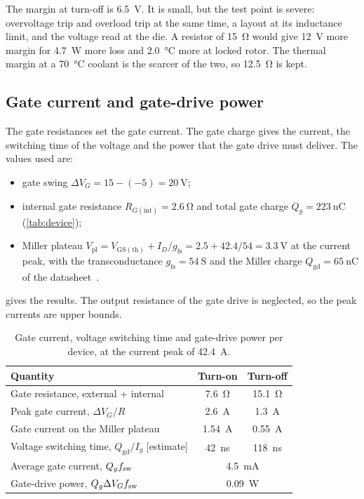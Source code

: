 The margin at turn-off is \SI{6.5}{\volt}. It is small, but the test point
is severe: overvoltage trip and overload trip at the same time, a layout at
its inductance limit, and the voltage read at the die. A resistor of
\SI{15}{\ohm} would give \SI{12}{\volt} more margin for \SI{4.7}{\watt} more
loss and \SI{2.0}{\celsius} more at locked rotor. The thermal margin at a
\SI{70}{\celsius} coolant is the scarcer of the two, so \SI{12.5}{\ohm} is
kept.

\subsection{Gate current and gate-drive power}
\label{sec:gatecurrent}

The gate resistances set the gate current. The gate charge gives the
current, the switching time of the voltage and the power that the gate drive
must deliver. The values used are:
\begin{itemize}
  \item gate swing $\Delta V_G = 15 - (-5) = \SI{20}{\volt}$;
  \item internal gate resistance $R_{G(\mathrm{int})} = \SI{2.6}{\ohm}$ and
        total gate charge $Q_g = \SI{223}{\nano\coulomb}$ (\cref{tab:device});
  \item Miller plateau $V_\mathrm{pl} = V_\mathrm{GS(th)} + I_D/g_\mathrm{fs}
        = 2.5 + 42.4/54 = \SI{3.3}{\volt}$ at the current peak, with the
        transconductance $g_\mathrm{fs} = \SI{54}{\siemens}$ and the
        Miller charge $Q_\mathrm{gd} = \SI{65}{\nano\coulomb}$ of the
        datasheet~\cite{wolfspeed_e3m0016}.
\end{itemize}

 gives the results. The output resistance of the
gate drive is neglected, so the peak currents are upper bounds.

\begin{table}[H]
\centering
\caption{Gate current, voltage switching time and gate-drive power per
device, at the current peak of \SI{42.4}{\ampere}.}
\label{tab:gatecurrent}
\zebra
\begin{tabular}{lcc}
\toprule
Quantity & Turn-on & Turn-off \\
\midrule
Gate resistance, external + internal & \SI{7.6}{\ohm} & \SI{15.1}{\ohm} \\
Peak gate current, $\Delta V_G/R$ & \SI{2.6}{\ampere} & \SI{1.3}{\ampere} \\
Gate current on the Miller plateau & \SI{1.54}{\ampere} & \SI{0.55}{\ampere} \\
Voltage switching time, $Q_\mathrm{gd}/I_g$ [estimate] & \SI{42}{\nano\second} & \SI{118}{\nano\second} \\
Average gate current, $Q_g f_{\mathrm{sw}}$ & \multicolumn{2}{c}{\SI{4.5}{\milli\ampere}} \\
Gate-drive power, $Q_g \Delta V_G f_{\mathrm{sw}}$ & \multicolumn{2}{c}{\SI{0.09}{\watt}} \\
\bottomrule
\end{tabular}
\end{table}

